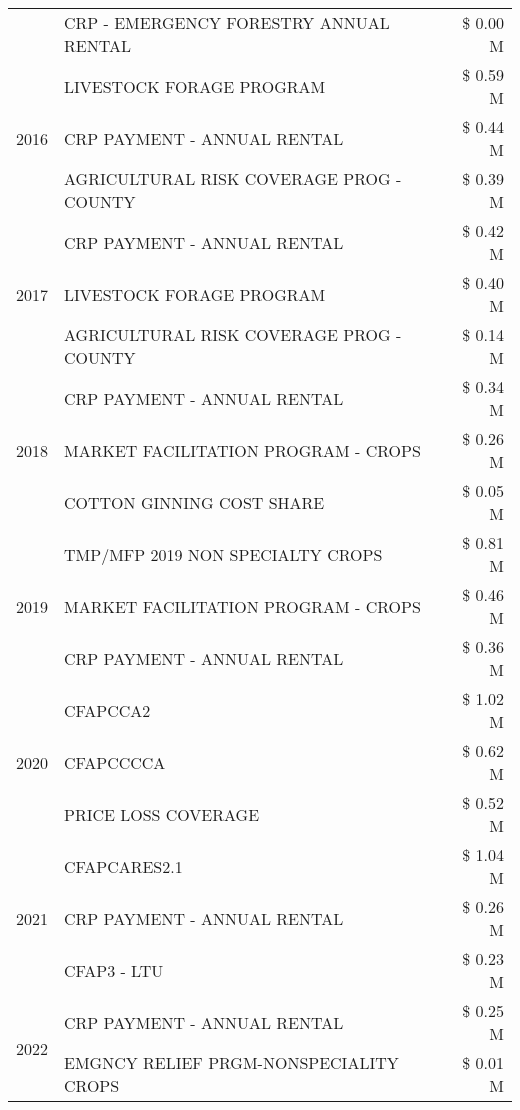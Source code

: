 \begin{tabular}{llr}
 & CRP - EMERGENCY FORESTRY ANNUAL RENTAL & \$ 0.00 M \\
\cline{1-3}
\multirow[t]{3}{*}{2016} & LIVESTOCK FORAGE PROGRAM & \$ 0.59 M \\
 & CRP PAYMENT - ANNUAL RENTAL & \$ 0.44 M \\
 & AGRICULTURAL RISK COVERAGE PROG - COUNTY & \$ 0.39 M \\
\cline{1-3}
\multirow[t]{3}{*}{2017} & CRP PAYMENT - ANNUAL RENTAL & \$ 0.42 M \\
 & LIVESTOCK FORAGE PROGRAM & \$ 0.40 M \\
 & AGRICULTURAL RISK COVERAGE PROG - COUNTY & \$ 0.14 M \\
\cline{1-3}
\multirow[t]{3}{*}{2018} & CRP PAYMENT - ANNUAL RENTAL & \$ 0.34 M \\
 & MARKET FACILITATION PROGRAM - CROPS & \$ 0.26 M \\
 & COTTON GINNING COST SHARE & \$ 0.05 M \\
\cline{1-3}
\multirow[t]{3}{*}{2019} & TMP/MFP 2019 NON SPECIALTY CROPS & \$ 0.81 M \\
 & MARKET FACILITATION PROGRAM - CROPS & \$ 0.46 M \\
 & CRP PAYMENT - ANNUAL RENTAL & \$ 0.36 M \\
\cline{1-3}
\multirow[t]{3}{*}{2020} & CFAPCCA2 & \$ 1.02 M \\
 & CFAPCCCCA & \$ 0.62 M \\
 & PRICE LOSS COVERAGE & \$ 0.52 M \\
\cline{1-3}
\multirow[t]{3}{*}{2021} & CFAPCARES2.1 & \$ 1.04 M \\
 & CRP PAYMENT - ANNUAL RENTAL & \$ 0.26 M \\
 & CFAP3 - LTU & \$ 0.23 M \\
\cline{1-3}
\multirow[t]{2}{*}{2022} & CRP PAYMENT - ANNUAL RENTAL & \$ 0.25 M \\
 & EMGNCY RELIEF PRGM-NONSPECIALITY CROPS & \$ 0.01 M \\
\cline{1-3}
\bottomrule
\end{tabular}
